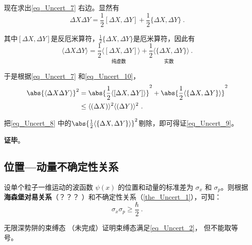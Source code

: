 现在求出\autoref{eq_Uncert_7} 右边。显然有
\begin{equation}
\Delta X \Delta Y = \frac{1}{2}[\Delta X, \Delta Y]+\frac{1}{2}\{\Delta X, \Delta Y\}~.
\end{equation}

其中$[\Delta X, \Delta Y]$是反厄米算符，$\frac{1}{2}\{\Delta X, \Delta Y\}$是厄米算符，因此有
\begin{equation}\label{eq_Uncert_10}
\langle\Delta X \Delta Y\rangle = \underset{\text{纯虚数}}{\frac{1}{2}\langle[\Delta X, \Delta Y]\rangle} + \underset{\text{实数}}{\frac{1}{2}\langle\{\Delta X, \Delta Y\}\rangle}~.
\end{equation}

于是根据\autoref{eq_Uncert_7} 和\autoref{eq_Uncert_10}，
\begin{equation}\label{eq_Uncert_8}
\begin{aligned}
\abs{\langle\Delta X \Delta Y\rangle}^2 &= \abs{\frac{1}{2}\langle[\Delta X, \Delta Y]\rangle}^2+\abs{\frac{1}{2}\langle\{\Delta X, \Delta Y\}\rangle}^2\\
&\leq\langle (\Delta X)\rangle^2\langle (\Delta Y)\rangle^2~.
\end{aligned}
\end{equation}

把\autoref{eq_Uncert_8} 中的$\abs{\frac{1}{2}\langle\{\Delta X, \Delta Y\}\rangle}^2$剔除，即可得证\autoref{eq_Uncert_9}。

\textbf{证毕}。






\subsection{位置—动量不确定性关系}
设单个粒子一维运动的波函数 $\psi(x)$ 的位置和动量的标准差为 $\sigma_x$ 和 $\sigma_p$。则根据\textbf{海森堡对易关系}（？？？
）和不确定性关系（\autoref{the_Uncert_1}），可知：
\begin{equation}\label{eq_Uncert_2}
\sigma_x \sigma_p \geqslant \frac{\hbar}{2}~.
\end{equation}

\begin{example}{无限深势阱的束缚态}\label{ex_Uncert_2}
（未完成）证明束缚态满足\autoref{eq_Uncert_2}， 但不能取等号。
\end{example}

